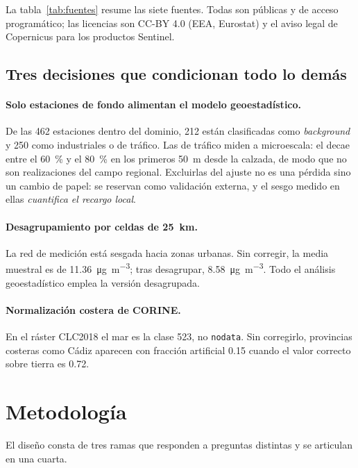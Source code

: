 \documentclass[10pt,twocolumn,a4paper]{article}
\newcommand{\ugm}{\si{\micro\gram\per\cubic\metre}}
\begin{document}
La tabla~\ref{tab:fuentes} resume las siete fuentes. Todas son públicas y de
acceso programático; las licencias son CC-BY 4.0 (EEA, Eurostat) y el aviso
legal de Copernicus para los productos Sentinel.

\subsection{Tres decisiones que condicionan todo lo demás}

\paragraph{Solo estaciones de fondo alimentan el modelo geoestadístico.}
De las \num{462} estaciones dentro del dominio, \num{212} están clasificadas
como \emph{background} y \num{250} como industriales o de tráfico. Las de
tráfico miden a microescala: el  decae entre el \SI{60}{\percent} y el
\SI{80}{\percent} en los primeros \SI{50}{\metre} desde la calzada, de modo
que no son realizaciones del campo regional. Excluirlas del ajuste no es una
pérdida sino un cambio de papel: se reservan como validación externa, y el
sesgo medido en ellas \emph{cuantifica el recargo local}.

\paragraph{Desagrupamiento por celdas de \SI{25}{\kilo\metre}.} La red de
medición está sesgada hacia zonas urbanas. Sin corregir, la media muestral es
de \SI{11.36}{\ugm}; tras desagrupar, \SI{8.58}{\ugm}. Todo el análisis
geoestadístico emplea la versión desagrupada.

\paragraph{Normalización costera de CORINE.} En el ráster CLC2018 el mar es la
clase \num{523}, no \texttt{nodata}. Sin corregirlo, provincias costeras como
Cádiz aparecen con fracción artificial \num{0.15} cuando el valor correcto
sobre tierra es \num{0.72}.

\section{Metodología}

El diseño consta de tres ramas que responden a preguntas distintas y se
articulan en una cuarta.
\end{document}
